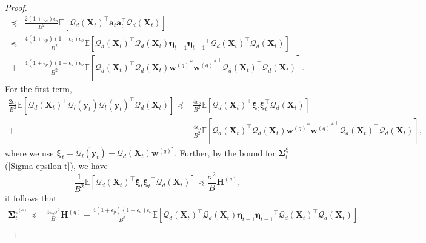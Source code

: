 \documentclass[11pt, letterpaper]{article}
\begin{document}
\begin{proof}
\begin{equation*}
\begin{aligned}
            \preceq&\frac{2(1+\epsilon_a)\epsilon_o}{B^2}\mathbb{E}\left[{\mathcal{Q}_d(\mathbf{X}_t)}^\top \mathbf{a}_t\mathbf{a}_t^\top \mathcal{Q}_d(\mathbf{X}_t)\right]\\
            \preceq&\frac{4(1+\epsilon_p)(1+\epsilon_a)\epsilon_o}{B^2}\mathbb{E}\left[{\mathcal{Q}_d(\mathbf{X}_t)}^\top {\mathcal{Q}_d(\mathbf{X}_t)}\boldsymbol{\eta}_{t-1}{\boldsymbol{\eta}_{t-1}}^\top{\mathcal{Q}_d(\mathbf{X}_t)}^\top  \mathcal{Q}_d(\mathbf{X}_t)\right]\\
            +&\frac{4(1+\epsilon_p)(1+\epsilon_a)\epsilon_o}{B^2}\mathbb{E}\left[{\mathcal{Q}_d(\mathbf{X}_t)}^\top {\mathcal{Q}_d(\mathbf{X}_t)} {\mathbf{w}^{(q)}}^*{{\mathbf{w}^{(q)}}^*}^\top{\mathcal{Q}_d(\mathbf{X}_t)}^\top \mathcal{Q}_d(\mathbf{X}_t)\right].
        \end{aligned}
    \end{equation*}
    For the first term,
    \begin{equation*}
        \begin{aligned}
            \frac{2\epsilon_o}{B^2}\mathbb{E}\left[{\mathcal{Q}_d(\mathbf{X}_t)}^\top \mathcal{Q}_l(\mathbf{y}_t)\mathcal{Q}_l(\mathbf{y}_t)^\top \mathcal{Q}_d(\mathbf{X}_t)\right]
            \preceq &\frac{4\epsilon_o}{B^2}\mathbb{E}\left[{\mathcal{Q}_d(\mathbf{X}_t)}^\top \boldsymbol{\xi}_t\boldsymbol{\xi}_t^\top \mathcal{Q}_d(\mathbf{X}_t)\right]\\
            +&\frac{4\epsilon_o}{B^2}\mathbb{E}\left[{\mathcal{Q}_d(\mathbf{X}_t)}^\top {\mathcal{Q}_d(\mathbf{X}_t)} {\mathbf{w}^{(q)}}^*{{\mathbf{w}^{(q)}}^*}^\top{\mathcal{Q}_d(\mathbf{X}_t)}^\top \mathcal{Q}_d(\mathbf{X}_t)\right],
        \end{aligned}
    \end{equation*}
    where we use $\boldsymbol{\xi}_t=\mathcal{Q}_l(\mathbf{y}_t)-\mathcal{Q}_d(\mathbf{X}_t)\mathbf{w}^{(q)^*}$. 
    Further, by the bound for $\boldsymbol{\Sigma}_t^\xi$ (\ref{Sigma epsilon t}), we have
    \begin{equation*}
        \frac{1}{B^2}\mathbb{E}\left[{\mathcal{Q}_d(\mathbf{X}_t)}^\top \boldsymbol{\xi}_{t}{\boldsymbol{\xi}_{t}}^\top  \mathcal{Q}_d(\mathbf{X}_t)\right]\preceq \frac{\sigma^2}{B}\mathbf{H}^{(q)},
    \end{equation*}
    it follows that
    \begin{equation}
    \label{sigma o t mul}
        \begin{aligned}
            \boldsymbol{\Sigma}_t^{\epsilon^{(o)}} \preceq &\frac{4\epsilon_o\sigma^2}{B}\mathbf{H}^{(q)}+\frac{4(1+\epsilon_p)(1+\epsilon_a)\epsilon_o}{B^2}\mathbb{E}\left[{\mathcal{Q}_d(\mathbf{X}_t)}^\top {\mathcal{Q}_d(\mathbf{X}_t)}\boldsymbol{\eta}_{t-1}{\boldsymbol{\eta}_{t-1}}^\top{\mathcal{Q}_d(\mathbf{X}_t)}^\top  \mathcal{Q}_d(\mathbf{X}_t)\right]\\

\end{aligned}
\end{equation}
\end{proof}
\end{document}
